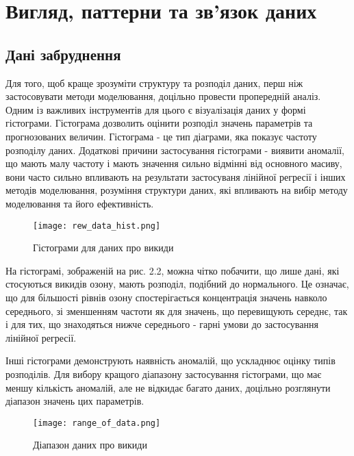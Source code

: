 \section{Вигляд, паттерни та зв'язок даних}

\subsection{Дані забруднення}

Для того, щоб краще зрозуміти структуру та розподіл даних, перш ніж застосовувати методи моделювання, доцільно провести пропередній аналіз. 
Одним із важливих інструментів для цього є візуалізація даних у формі гістограми. 
Гістограма дозволить оцінити розподіл значень параметрів та прогнозованих величин.
Гістограма - це тип діаграми, яка показує частоту розподілу даних. 
Додаткові причини застосування гістограми - виявити аномалії, що мають малу частоту і мають значення сильно відмінні від основного масиву,  вони часто сильно впливають на результати застосуваня лінійної регресії і інших методів моделювання, розуміння структури даних, які впливають на вибір методу моделювання та його ефективність.


\begin{figure}[h]
    \begin{center}
        \texttt{[image: rew\_data\_hist.png]}
        \caption{Гістограми для даних про викиди}
    \end{center}
\end{figure}

На гістограмі, зображеній на рис. 2.2, можна чітко побачити, що лише дані, які стосуються викидів озону, мають розподіл, подібний до нормального. 
Це означає, що для більшості рівнів озону спостерігається концентрація значень навколо середнього, зі зменшенням частоти як для значень, що перевищують середнє, так і для тих, що знаходяться нижче середнього - гарні умови до застосування лінійної регресії.


Інші гістограми демонструють наявність аномалій, що ускладнює оцінку типів розподілів. 
Для вибору кращого діапазону застосування гістограми, що має меншу кількість аномалій, але не відкидає багато даних, доцільно розглянути діапазон значень цих параметрів. 


\begin{figure}[H]
    \begin{center}
        \texttt{[image: range\_of\_data.png]}
        \caption{Діапазон даних про викиди}
    \end{center}
\end{figure}



